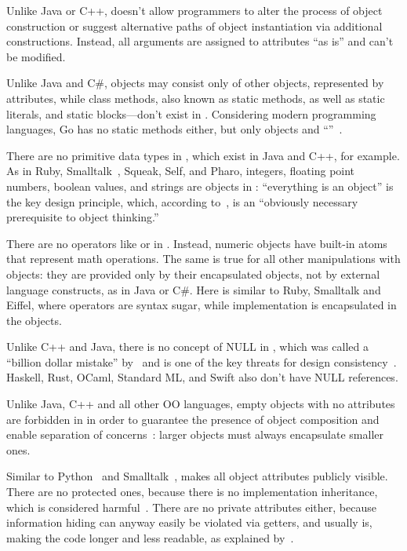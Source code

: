 %
Unlike Java or C++, \eolang{} doesn't allow programmers to alter
the process of object construction or suggest alternative
paths of object instantiation via additional constructions.
Instead, all arguments are assigned to attributes ``as is'' and can't be modified.

%
Unlike Java and C\#,
\eolang{} objects may consist only of other objects, represented
by attributes, while class methods, also known as static methods, as well as
static literals, and static blocks---don't exist in \eolang{}.
Considering modern programming languages, Go has no static methods either,
but only objects and ``''~\citep{schmager2010gohotdraw}.

%
There are no primitive data types in \eolang{}, which
exist in Java and C++, for example.
As in Ruby, Smalltalk~\citep*{goldbergrobson1983smalltalk}, Squeak, Self, and Pharo,
integers, floating point numbers, boolean
values, and strings are objects in \eolang{}:
``everything is an object'' is the key design principle, which,
according to~\citet[p.66]{west2004object}, is an ``obviously necessary prerequisite
to object thinking.''

%
There are no operators like \ff{+} or \ff{/} in \eolang{}. Instead,
numeric objects have built-in atoms that represent math operations. The same
is true for all other manipulations with objects: they are provided
only by their encapsulated objects, not by external language constructs, as in
Java or C\#. Here \eolang{} is similar to Ruby, Smalltalk and Eiffel,
where operators are syntax sugar, while implementation is encapsulated in
the objects.

%
Unlike C++ and Java, there is no concept of NULL in \eolang{}, which
was called a ``billion dollar mistake'' by~\citet{hoare2009null} and
is one of the key threats for design consistency~\citep{eo1}.
Haskell, Rust, OCaml, Standard ML, and Swift also don't have NULL references.

%
Unlike Java, C++ and all other OO languages,
empty objects with no attributes are forbidden in \eolang{} in order
to guarantee the presence of object composition and
enable separation of concerns~\citep{dijkstra1982role}:
larger objects must always encapsulate smaller ones.

%
Similar to Python~\citep{lutz2013learning} and Smalltalk~\citep{hunt1997smalltalk},
\eolang{} makes all object attributes publicly visible.
There are no protected ones, because there is no implementation
inheritance, which is considered harmful~\citep{hunt2000}.
There are no private attributes either, because information
hiding can anyway easily be violated via getters, and usually is, making the code longer
and less readable, as explained by~\citet{holub2004more}.

